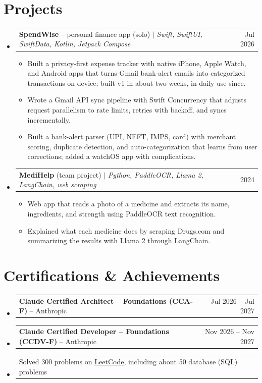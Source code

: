 \documentclass[a4paper,11pt]{article}
\makeatletter
\newcommand{\resumeItem}[1]{\item\small{#1\vspace{-1pt}}}
\newcommand{\resumeProjectHeading}[2]{
    \item
    \begin{tabularx}{0.97\textwidth}{@{}>{\raggedright\arraybackslash}X@{\hspace{0.75em}}r@{}}
      \small#1 & #2 \\
    \end{tabularx}\vspace{-3pt}
}
\newcommand{\resumeSubItemListStart}{\begin{itemize}[leftmargin=0.15in, label={}]}
\newcommand{\resumeSubItemListEnd}{\end{itemize}}
\newcommand{\resumeItemListStart}{\begin{itemize}[itemsep=2pt]}
\newcommand{\resumeItemListEnd}{\end{itemize}\vspace{-2pt}}
\makeatother
\begin{document}
\section{Projects}
  \resumeSubItemListStart

    \resumeProjectHeading
      {\textbf{SpendWise} -- personal finance app (solo) $|$ \emph{Swift, SwiftUI, SwiftData, Kotlin, Jetpack Compose}}{Jul 2026}
      \resumeItemListStart
        \resumeItem{Built a privacy-first expense tracker with native iPhone, Apple Watch, and Android apps that turns Gmail bank-alert emails into categorized transactions on-device; built v1 in about two weeks, in daily use since.}
        \resumeItem{Wrote a Gmail API sync pipeline with Swift Concurrency that adjusts request parallelism to rate limits, retries with backoff, and syncs incrementally.}
        \resumeItem{Built a bank-alert parser (UPI, NEFT, IMPS, card) with merchant scoring, duplicate detection, and auto-categorization that learns from user corrections; added a watchOS app with complications.}
      \resumeItemListEnd

    \resumeProjectHeading
      {\textbf{MediHelp} (team project) $|$ \emph{Python, PaddleOCR, Llama 2, LangChain, web scraping}}{2024}
      \resumeItemListStart
        \resumeItem{Web app that reads a photo of a medicine and extracts its name, ingredients, and strength using PaddleOCR text recognition.}
        \resumeItem{Explained what each medicine does by scraping Drugs.com and summarizing the results with Llama 2 through LangChain.}
      \resumeItemListEnd

  \resumeSubItemListEnd

\section{Certifications \& Achievements}
  \resumeSubItemListStart
    \resumeProjectHeading
      {\textbf{Claude Certified Architect -- Foundations (CCA-F)} -- Anthropic}{Jul 2026 -- Jul 2027}
    \resumeProjectHeading
      {\textbf{Claude Certified Developer -- Foundations (CCDV-F)} -- Anthropic}{Nov 2026 -- Nov 2027}
    \resumeProjectHeading
      {Solved 300 problems on \href{https://leetcode.com/u/sAMurai7781/}{\underline{LeetCode}}, including about 50 database (SQL) problems}{}
  \resumeSubItemListEnd

\end{document}
